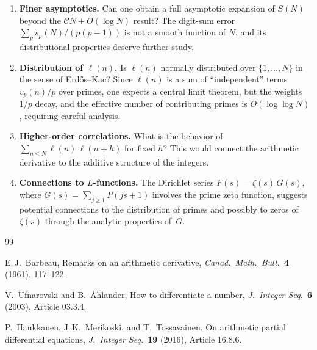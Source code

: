 \documentclass[11pt,a4paper]{amsart}
\theoremstyle{plain}
\theoremstyle{definition}
\begin{document}
\begin{enumerate}[(1)]
\item \textbf{Finer asymptotics.}  Can one obtain a full asymptotic expansion 
of $S(N)$ beyond the $\mathcal{C}N + O(\log N)$ result?  The digit-sum 
error $\sum_p s_p(N)/(p(p-1))$ is not a smooth function of $N$, and 
its distributional properties deserve further study.

\item \textbf{Distribution of $\ell(n)$.}  Is $\ell(n)$ normally distributed 
over $\{1, \ldots, N\}$ in the sense of Erd\H{o}s--Kac?  Since $\ell(n)$ 
is a sum of ``independent'' terms $v_p(n)/p$ over primes, one expects a 
central limit theorem, but the weights $1/p$ decay, and the effective 
number of contributing primes is $O(\log\log N)$, requiring careful analysis.

\item \textbf{Higher-order correlations.}  What is the behavior of 
$\sum_{n \le N} \ell(n)\,\ell(n+h)$ for fixed $h$?  This would connect 
the arithmetic derivative to the additive structure of the integers.

\item \textbf{Connections to $L$-functions.}  The Dirichlet series 
$F(s) = \zeta(s)\,G(s)$, where $G(s) = \sum_{j \ge 1} P(js+1)$ involves 
the prime zeta function, suggests potential connections to the distribution 
of primes and possibly to zeros of $\zeta(s)$ through the analytic properties 
of~$G$.
\end{enumerate}

\begin{thebibliography}{99}

E.\,J.~Barbeau, Remarks on an arithmetic derivative, 
\emph{Canad.\ Math.\ Bull.}\ \textbf{4} (1961), 117--122.

V.~Ufnarovski and B.~{\AA}hlander, How to differentiate a number, 
\emph{J.\ Integer Seq.}\ \textbf{6} (2003), Article 03.3.4.

P.~Haukkanen, J.\,K.~Merikoski, and T.~Tossavainen, On arithmetic partial 
differential equations, \emph{J.\ Integer Seq.}\ \textbf{19} (2016), Article 16.8.6.

\end{thebibliography}
\end{document}
